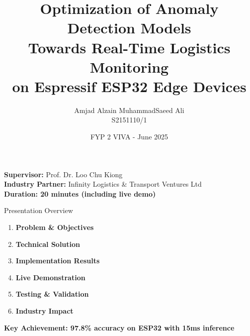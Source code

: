 \documentclass[aspectratio=169]{beamer}
\title[ESP32 Anomaly Detection]{Optimization of Anomaly Detection Models\\Towards Real-Time Logistics Monitoring\\on Espressif ESP32 Edge Devices}
\author{Amjad Alzain MuhammadSaeed Ali\\S2151110/1}
\institute{Faculty of Computer Science \& Information Technology\\University of Malaya}
\date{FYP 2 VIVA - June 2025}
\begin{document}
\begin{frame}
\titlepage
\vspace{-0.5cm}
\begin{center}
\textbf{Supervisor:} Prof. Dr. Loo Chu Kiong\\
\textbf{Industry Partner:} Infinity Logistics \& Transport Ventures Ltd\\
\vspace{0.3cm}
\textcolor{umblue}{\textbf{Duration: 20 minutes (including live demo)}}
\end{center}
\end{frame}

\begin{frame}{Presentation Overview}
\begin{enumerate}
\item \textbf{Problem \& Objectives}
\item \textbf{Technical Solution}
\item \textbf{Implementation Results}
\item \textbf{Live Demonstration}
\item \textbf{Testing \& Validation}
\item \textbf{Industry Impact}
\end{enumerate}

\vspace{0.5cm}
\begin{center}
\textcolor{umblue}{\textbf{Key Achievement: 97.8\% accuracy on ESP32 with 15ms inference}}
\end{center}
\end{frame}
\end{document}
